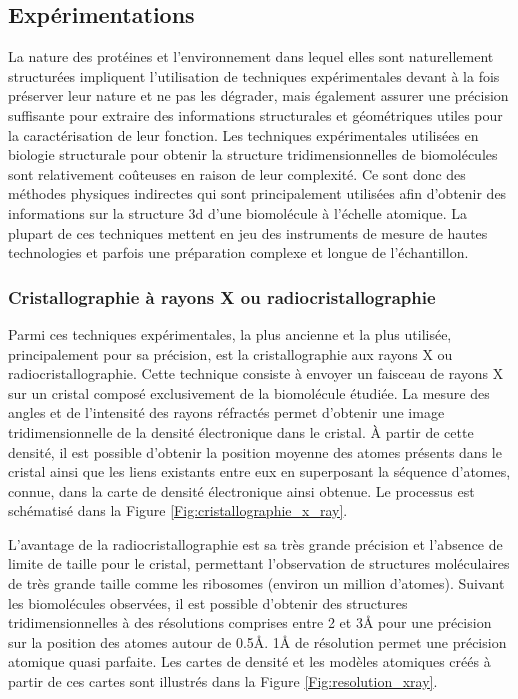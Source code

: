 \subsection{Expérimentations}

La nature des protéines et l'environnement dans lequel elles sont naturellement structurées impliquent l'utilisation de techniques expérimentales devant à la fois préserver leur nature et ne pas les dégrader, mais également assurer une précision suffisante pour extraire des informations structurales et géométriques utiles pour la caractérisation de leur fonction.
Les techniques expérimentales utilisées en biologie structurale pour obtenir la structure tridimensionnelles de biomolécules sont relativement coûteuses en raison de leur complexité. Ce sont donc des méthodes physiques indirectes qui sont principalement utilisées afin d'obtenir des informations sur la structure 3d d'une biomolécule à l'échelle atomique. La plupart de ces techniques mettent en jeu des instruments de mesure de hautes technologies et parfois une préparation complexe et longue de l'échantillon.

\subsubsection{Cristallographie à rayons X ou radiocristallographie}

Parmi ces techniques expérimentales, la plus ancienne et la plus utilisée, principalement pour sa précision, est la cristallographie aux rayons X ou radiocristallographie. Cette technique consiste à envoyer un faisceau de rayons X sur un cristal composé exclusivement de la biomolécule étudiée. La mesure des angles et de l'intensité des rayons réfractés permet d'obtenir une image tridimensionnelle de la densité électronique dans le cristal. À partir de cette densité, il est possible d'obtenir la position moyenne des atomes présents dans le cristal ainsi que les liens existants entre eux en superposant la séquence d'atomes, connue, dans la carte de densité électronique ainsi obtenue. Le processus est schématisé dans la Figure \ref{Fig:cristallographie_x_ray}.

L'avantage de la radiocristallographie est sa très grande précision et l'absence de limite de taille pour le cristal, permettant l'observation de structures moléculaires de très grande taille comme les ribosomes (environ un million d'atomes). Suivant les biomolécules observées, il est possible d'obtenir des structures tridimensionnelles à des résolutions comprises entre 2 et 3\r{A} pour une précision sur la position des atomes autour de 0.5\r{A}. 1\r{A} de résolution permet une précision atomique quasi parfaite. Les cartes de densité et les modèles atomiques créés à partir de ces cartes sont illustrés dans la Figure \ref{Fig:resolution_xray}.

